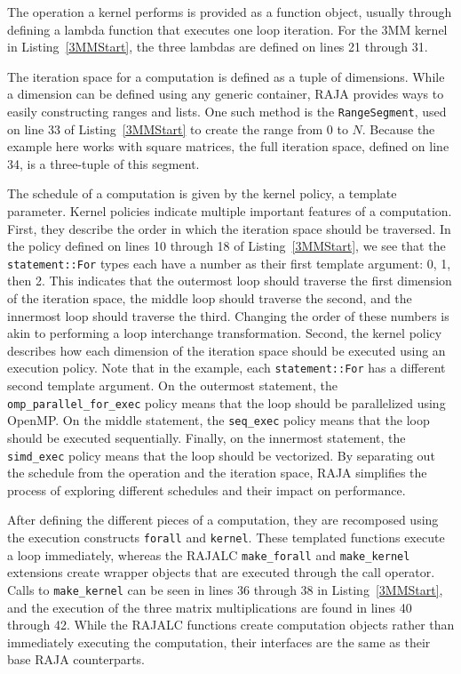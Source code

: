 The operation a kernel performs is provided as a function object, usually through defining a lambda function that executes one loop iteration.
For the 3MM kernel in Listing~\ref{3MMStart}, the three lambdas are defined on lines 21 through 31. 

The iteration space for a computation is defined as a tuple of dimensions.
While a dimension can be defined using any generic container, RAJA provides ways to easily constructing ranges and lists.
One such method is the \verb.RangeSegment., used on line 33 of Listing~\ref{3MMStart} to create the range from $0$ to $N$. 
Because the example here works with square matrices, the full iteration space, defined on line 34, is a three-tuple of this segment. 

The schedule of a computation is given by the kernel policy, a template parameter. 
Kernel policies indicate multiple important features of a computation.
First, they describe the order in which the iteration space should be traversed.
In the policy defined on lines 10 through 18 of Listing~\ref{3MMStart}, we see that the \verb.statement::For. types each have a number as their first template argument: 0, 1, then 2.
This indicates that the outermost loop should traverse the first dimension of the iteration space, the middle loop should traverse the second, and the innermost loop should traverse the third. 
Changing the order of these numbers is akin to performing a loop interchange transformation.
Second, the kernel policy describes how each dimension of the iteration space should be executed using an execution policy.
Note that in the example, each \verb.statement::For. has a different second template argument.
On the outermost statement, the \verb.omp_parallel_for_exec. policy means that the loop should be parallelized using OpenMP\@. 
On the middle statement, the \verb.seq_exec. policy means that the loop should be executed sequentially.
Finally, on the innermost statement, the \verb.simd_exec. policy means that the loop should be vectorized.
By separating out the schedule from the operation and the iteration space, RAJA simplifies the process of exploring different schedules and their impact on performance.

After defining the different pieces of a computation, they are recomposed using the execution constructs \verb.forall. and \verb.kernel..
These templated functions execute a loop immediately, whereas the RAJALC \verb.make_forall. and \verb.make_kernel. extensions create wrapper objects that are executed through the call operator. 
Calls to \verb.make_kernel. can be seen in lines 36 through 38 in Listing~\ref{3MMStart}, and the execution of the three matrix multiplications are found in lines 40 through 42. 
While the RAJALC functions create computation objects rather than immediately executing the computation, their interfaces are the same as their base RAJA counterparts.

